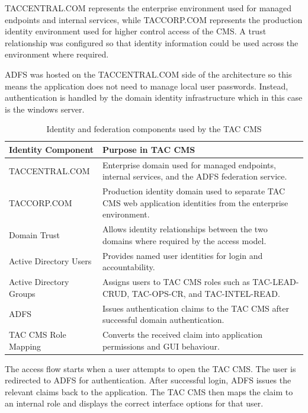 TACCENTRAL.COM represents the enterprise environment used for managed endpoints and internal services, while TACCORP.COM represents the production identity environment used for higher control access of the CMS. A trust relationship was configured so that identity information could be used across the environment where required.

ADFS was hosted on the TACCENTRAL.COM side of the architecture so this means the application does not need to manage local user passwords. Instead, authentication is handled by the domain identity infrastructure which in this case is the windows server.

\vspace{1cm}

\begin{table}[H]
\centering
\small
\renewcommand{\arraystretch}{1.35}
\begin{tabular}{|>{\raggedright\arraybackslash}p{3.4cm}|>{\raggedright\arraybackslash}p{9cm}|}
\hline
\textbf{Identity Component} & \textbf{Purpose in TAC CMS} \\
\hline
TACCENTRAL.COM & Enterprise domain used for managed endpoints, internal services, and the ADFS federation service. \\
\hline
TACCORP.COM & Production identity domain used to separate TAC CMS web application identities from the enterprise environment. \\
\hline
Domain Trust & Allows identity relationships between the two domains where required by the access model. \\
\hline
Active Directory Users & Provides named user identities for login and accountability. \\
\hline
Active Directory Groups & Assigns users to TAC CMS roles such as TAC-LEAD-CRUD, TAC-OPS-CR, and TAC-INTEL-READ. \\
\hline
ADFS & Issues authentication claims to the TAC CMS after successful domain authentication. \\
\hline
TAC CMS Role Mapping & Converts the received claim into application permissions and GUI behaviour. \\
\hline
\end{tabular}
\caption{Identity and federation components used by the TAC CMS}
\label{tab:identity-federation-components}
\end{table}
\vspace{2cm}

The access flow starts when a user attempts to open the TAC CMS. The user is redirected to ADFS for authentication. After successful login, ADFS issues the relevant claims back to the application. The TAC CMS then maps the claim to an internal role and displays the correct interface options for that user.

